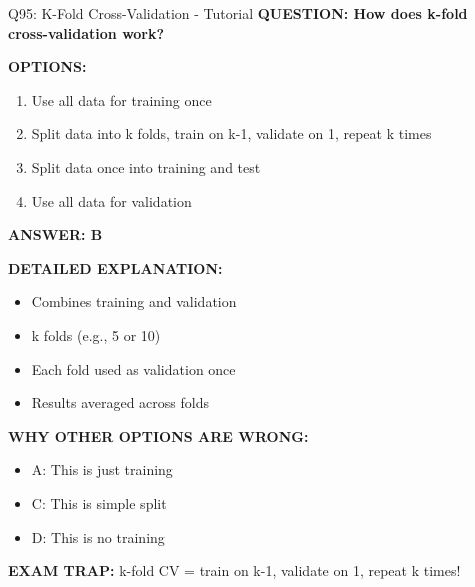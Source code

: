 \documentclass[8pt]{beamer}
\begin{document}
	\begin{frame}{Q95: K-Fold Cross-Validation - Tutorial}
		\fontsize{6.5}{7.5}\selectfont
		\textbf{QUESTION: How does k-fold cross-validation work?}
		
		\vspace{0.1cm}
		\textbf{OPTIONS:}
		\begin{enumerate}
			\item Use all data for training once
			\item Split data into k folds, train on k-1, validate on 1, repeat k times
			\item Split data once into training and test
			\item Use all data for validation
		\end{enumerate}
		
		\vspace{0.1cm}
		\textcolor{myblue}{\textbf{ANSWER: B}}
		
		\vspace{0.1cm}
		\textbf{DETAILED EXPLANATION:}
		\begin{itemize}
			\item Combines training and validation
			\item k folds (e.g., 5 or 10)
			\item Each fold used as validation once
			\item Results averaged across folds
		\end{itemize}
		
		\vspace{0.1cm}
		\textcolor{myred}{\textbf{WHY OTHER OPTIONS ARE WRONG:}}
		\begin{itemize}
			\item \textcolor{myred}{A:} This is just training
			\item \textcolor{myred}{C:} This is simple split
			\item \textcolor{myred}{D:} This is no training
		\end{itemize}
		
		\textcolor{myred}{\textbf{EXAM TRAP:}} k-fold CV = \textcolor{myblue}{train on k-1, validate on 1, repeat k times}!
	\end{frame}
	
\end{document}
